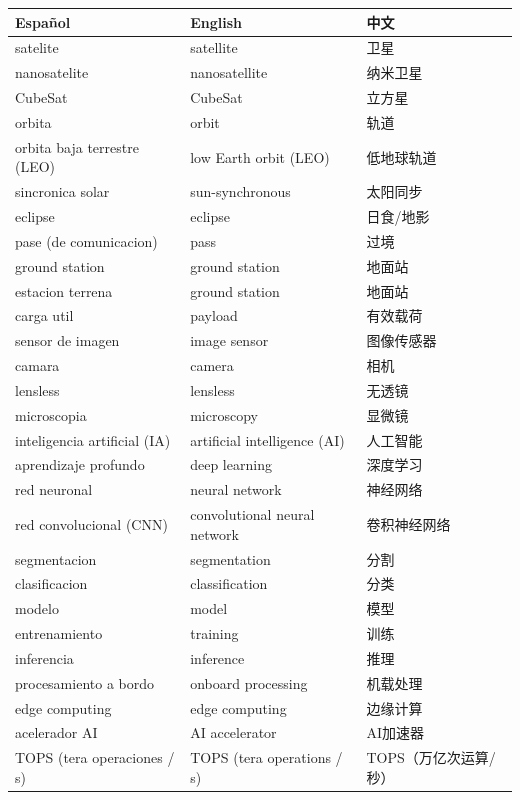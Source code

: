 \documentclass[11pt,a4paper]{report}
\begin{document}
\begin{center}
\small
\begin{longtable}{p{4cm}p{4cm}p{4.5cm}}
\toprule
\textbf{Español} & \textbf{English} & \textbf{中文} \\
\midrule
\endhead
satelite & satellite & 卫星 \\
nanosatelite & nanosatellite & 纳米卫星 \\
CubeSat & CubeSat & 立方星 \\
orbita & orbit & 轨道 \\
orbita baja terrestre (LEO) & low Earth orbit (LEO) & 低地球轨道 \\
sincronica solar & sun-synchronous & 太阳同步 \\
eclipse & eclipse & 日食/地影 \\
pase (de comunicacion) & pass & 过境 \\
ground station & ground station & 地面站 \\
estacion terrena & ground station & 地面站 \\
carga util & payload & 有效载荷 \\
sensor de imagen & image sensor & 图像传感器 \\
camara & camera & 相机 \\
lensless & lensless & 无透镜 \\
microscopia & microscopy & 显微镜 \\
inteligencia artificial (IA) & artificial intelligence (AI) & 人工智能 \\
aprendizaje profundo & deep learning & 深度学习 \\
red neuronal & neural network & 神经网络 \\
red convolucional (CNN) & convolutional neural network & 卷积神经网络 \\
segmentacion & segmentation & 分割 \\
clasificacion & classification & 分类 \\
modelo & model & 模型 \\
entrenamiento & training & 训练 \\
inferencia & inference & 推理 \\
procesamiento a bordo & onboard processing & 机载处理 \\
edge computing & edge computing & 边缘计算 \\
acelerador AI & AI accelerator & AI加速器 \\
TOPS (tera operaciones / s) & TOPS (tera operations / s) & TOPS（万亿次运算/秒） \\

\end{longtable}
\end{center}
\end{document}
